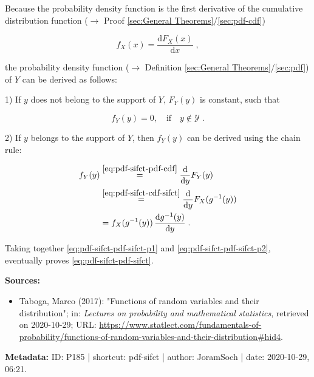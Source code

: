 \documentclass[a4paper,12pt,twoside]{book}
\begin{document}
Because the probability density function is the first derivative of the cumulative distribution function ($\rightarrow$ Proof \ref{sec:General Theorems}/\ref{sec:pdf-cdf})

\begin{equation} \label{eq:pdf-sifct-pdf-cdf}
f_X(x) = \frac{\mathrm{d}F_X(x)}{\mathrm{d}x} \; ,
\end{equation}

the probability density function ($\rightarrow$ Definition \ref{sec:General Theorems}/\ref{sec:pdf}) of $Y$ can be derived as follows:

1) If $y$ does not belong to the support of $Y$, $F_Y(y)$ is constant, such that

\begin{equation} \label{eq:pdf-sifct-pdf-sifct-p1}
f_Y(y) = 0, \quad \text{if} \quad y \notin \mathcal{Y} \; .
\end{equation}

2) If $y$ belongs to the support of $Y$, then $f_Y(y)$ can be derived using the chain rule:

\begin{equation} \label{eq:pdf-sifct-pdf-sifct-p2}
\begin{split}
f_Y(y) &\overset{\eqref{eq:pdf-sifct-pdf-cdf}}{=} \frac{\mathrm{d}}{\mathrm{d}y} F_Y(y) \\
&\overset{\eqref{eq:pdf-sifct-cdf-sifct}}{=} \frac{\mathrm{d}}{\mathrm{d}y} F_X(g^{-1}(y)) \\
&= f_X(g^{-1}(y)) \, \frac{\mathrm{d}g^{-1}(y)}{\mathrm{d}y} \; .
\end{split}
\end{equation}

Taking together \eqref{eq:pdf-sifct-pdf-sifct-p1} and \eqref{eq:pdf-sifct-pdf-sifct-p2}, eventually proves \eqref{eq:pdf-sifct-pdf-sifct}.


\vspace{1em}
\textbf{Sources:}
\begin{itemize}
\item Taboga, Marco (2017): "Functions of random variables and their distribution"; in: \textit{Lectures on probability and mathematical statistics}, retrieved on 2020-10-29; URL: \url{https://www.statlect.com/fundamentals-of-probability/functions-of-random-variables-and-their-distribution#hid4}.
\end{itemize}


\vspace{1em}
\textbf{Metadata:} ID: P185 | shortcut: pdf-sifct | author: JoramSoch | date: 2020-10-29, 06:21.
\vspace{1em}
\end{document}
